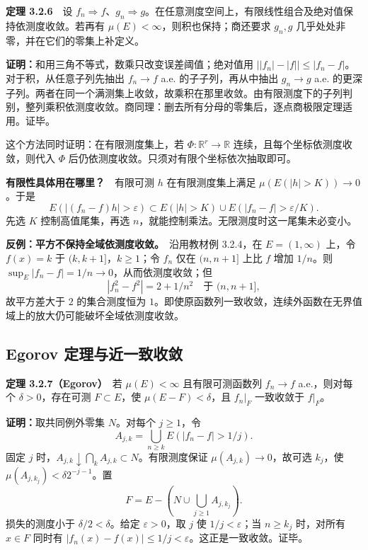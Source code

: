 \documentclass[11pt,a4paper]{article}
\begin{document}
\textbf{定理 3.2.6}　设
\(f_n\Rightarrow f\)、\(g_n\Rightarrow g\)。在任意测度空间上，有限线性组合及绝对值保持依测度收敛。若再有
\(\mu(E)<\infty\)，则积也保持；商还要求 \(g_n,g\)
几乎处处非零，并在它们的零集上补定义。

\textbf{证明：}和用三角不等式，数乘只改变误差阈值；绝对值用
\(\bigl||f_n|-|f|\bigr|\le|f_n-f|\)。对于积，从任意子列先抽出
\(f_n\to f\) a.e. 的子子列，再从中抽出 \(g_n\to g\) a.e.
的更深子列。两者在同一个满测集上收敛，故乘积在那里收敛。由有限测度下的子列判别，整列乘积依测度收敛。商同理：删去所有分母的零集后，逐点商极限定理适用。证毕。

这个方法同时证明：在有限测度集上，若 \(\Phi:\mathbb R^r\to\mathbb R\)
连续，且每个坐标依测度收敛，则代入 \(\Phi\)
后仍依测度收敛。只须对有限个坐标依次抽取即可。

\textbf{有限性具体用在哪里？}　有限可测 \(h\) 在有限测度集上满足
\(\mu(E(|h|>K))\to0\)。于是 \[
E(|(f_n-f)h|>\varepsilon)
\subset E(|h|>K)\cup E(|f_n-f|>\varepsilon/K).
\] 先选 \(K\) 控制高值尾集，再选
\(n\)，就能控制乘法。无限测度时这一尾集未必变小。

\textbf{反例：平方不保持全域依测度收敛。}　沿用教材例 3.2.4，在
\(E=(1,\infty)\) 上，令 \(f(x)=k\) 于 \((k,k+1]\)，\(k\ge1\)；令 \(f_n\)
仅在 \((n,n+1]\) 上比 \(f\) 增加 \(1/n\)。则
\(\sup_E|f_n-f|=1/n\to0\)，从而依测度收敛；但 \[
|f_n^2-f^2|=2+1/n^2\quad\text{于 }(n,n+1],
\] 故平方差大于 \(2\) 的集合测度恒为
\(1\)。即使原函数列一致收敛，连续外函数在无界值域上的放大仍可能破坏全域依测度收敛。

\subsection{Egorov
定理与近一致收敛}\label{egorov-ux5b9aux7406ux4e0eux8fd1ux4e00ux81f4ux6536ux655b}

\textbf{定理 3.2.7（Egorov）}　若 \(\mu(E)<\infty\) 且有限可测函数列
\(f_n\to f\) a.e.，则对每个 \(\delta>0\)，存在可测 \(F\subset E\)，使
\(\mu(E-F)<\delta\)，且 \(f_n|_F\) 一致收敛于 \(f|_F\)。

\textbf{证明：}取共同例外零集 \(N\)。对每个 \(j\ge1\)，令 \[
A_{j,k}=\bigcup_{n\ge k}E(|f_n-f|>1/j).
\] 固定 \(j\)
时，\(A_{j,k}\downarrow\bigcap_k A_{j,k}\subset N\)。有限测度保证
\(\mu(A_{j,k})\to0\)，故可选 \(k_j\)，使
\(\mu(A_{j,k_j})<\delta 2^{-j-1}\)。置 \[
F=E-\left(N\cup\bigcup_{j\ge1}A_{j,k_j}\right).
\] 损失的测度小于 \(\delta/2<\delta\)。给定 \(\varepsilon>0\)，取 \(j\)
使 \(1/j<\varepsilon\)；当 \(n\ge k_j\) 时，对所有 \(x\in F\) 同时有
\(|f_n(x)-f(x)|\le1/j<\varepsilon\)。这正是一致收敛。证毕。
\end{document}
